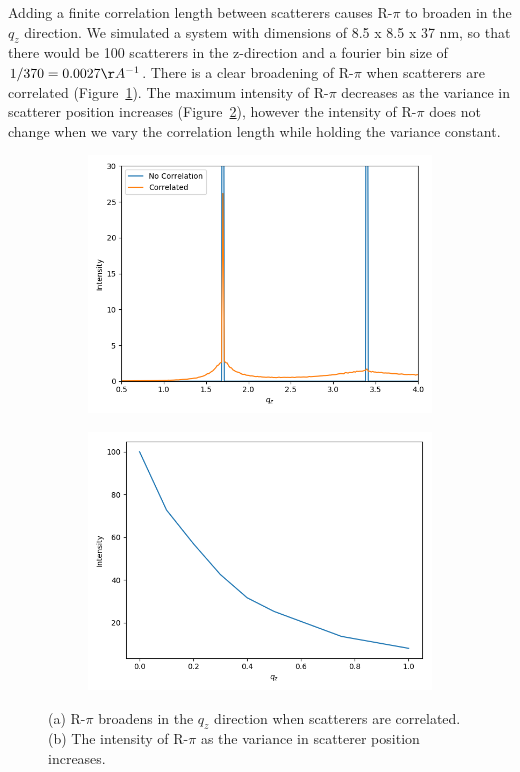 \documentclass{article}
\begin{document}
  Adding a finite correlation length between scatterers causes R-$\pi$ to
  broaden in the $q_z$ direction. We simulated a system with dimensions of 8.5 x
  8.5 x 37 nm, so that there would be 100 scatterers in the z-direction and a
  fourier bin size of $1/370=0.0027 \AA^{-1}$. There is a clear broadening of
  R-$\pi$ when scatterers are correlated
  (Figure~\ref{fig:correlation_comparison}). The maximum intensity of R-$\pi$
  decreases as the variance in scatterer position increases
  (Figure~\ref{fig:correlation_decay}), however the intensity of R-$\pi$ does not
  change when we vary the correlation length while holding the variance constant. 

  \begin{figure}[!htb]
  \centering
  \begin{subfigure}{0.45\textwidth}
  \includegraphics[width=\textwidth]{correlation.png}
  \caption{}\label{fig:correlation_comparison}
  \end{subfigure}
  \begin{subfigure}{0.45\textwidth}
  \includegraphics[width=\textwidth]{correlation_decay.png}
  \caption{}\label{fig:correlation_decay}
  \end{subfigure}
  \caption{(a) R-$\pi$ broadens in the $q_z$ direction when scatterers are correlated.
  (b) The intensity of R-$\pi$ as the variance in scatterer position increases.}\label{fig:correlation}
  \end{figure}
\end{document}
